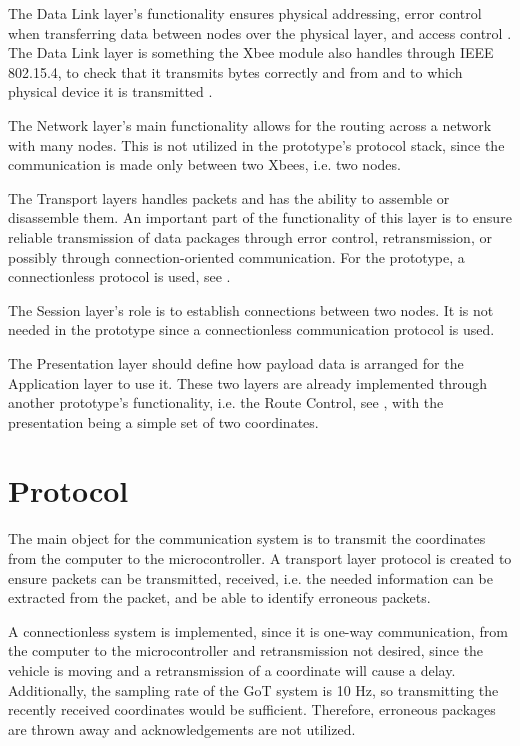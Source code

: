 The Data Link layer's functionality ensures physical addressing, error control when transferring data between nodes over the physical layer, and access control \cite{J.M.Network}. The Data Link layer is something the Xbee module also handles through IEEE 802.15.4, to check that it transmits bytes correctly and from and to which physical device it is transmitted \cite{IEEE812154}.

The Network layer's main functionality allows for the routing across a network with many nodes. This is not utilized in the prototype's protocol stack, since the communication is made only between two Xbees, i.e. two nodes.

The Transport layers handles packets and has the ability to assemble or disassemble them. An important part of the functionality of this layer is to ensure reliable transmission of data packages through error control, retransmission, or possibly through connection-oriented communication. For the prototype, a connectionless protocol is used, see .

The Session layer's role is to establish connections between two nodes. It is not needed in the prototype since a connectionless communication protocol is used.

The Presentation layer should define how payload data is arranged for the Application layer to use it. These two layers are already implemented through another prototype's functionality, i.e. the Route Control, see , with the presentation being a simple set of two coordinates.


\section{Protocol}\label{sec:Protocol}
The main object for the communication system is to transmit the coordinates from the computer to the microcontroller. A transport layer protocol is created to ensure packets can be transmitted, received, i.e. the needed information can be extracted from the packet, and be able to identify erroneous packets.

A connectionless system is implemented, since it is one-way communication, from the computer to the microcontroller and retransmission not desired, since the vehicle is moving and a retransmission of a coordinate will cause a delay. Additionally, the sampling rate of the GoT system is 10 \si{Hz}, so transmitting the recently received coordinates would be sufficient. Therefore, erroneous packages are thrown away and acknowledgements are not utilized.

